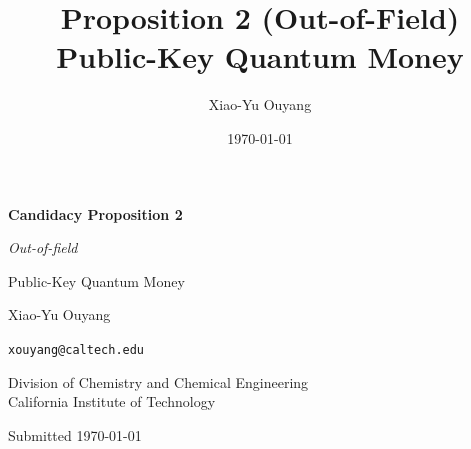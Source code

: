 \documentclass[12pt]{article}
\title{Proposition 2 (Out-of-Field) \\[0.25em]
       \large Public-Key Quantum Money}
\author{Xiao-Yu Ouyang}
\date{\today}
\begin{document}
\begin{titlepage}
  \centering
  \vspace*{2cm}
  {\Large \bfseries Candidacy Proposition 2\par}
  \vspace{0.5cm}
  {\large \textit{Out-of-field}\par}
  \vspace{1.5cm}
  {\LARGE Public-Key Quantum Money\par}
  \vspace{2cm}
  {\large Xiao-Yu Ouyang \par}
  \vspace{0.5cm}
  {\normalsize \texttt{xouyang@caltech.edu} \par}
  \vspace{1.5cm}
  {\normalsize Division of Chemistry and Chemical Engineering \\
               California Institute of Technology \par}
  \vfill
  {\normalsize Submitted \today \par}
\end{titlepage}

\begin{singlespace}
\tableofcontents
\end{singlespace}
\newpage
\end{document}
